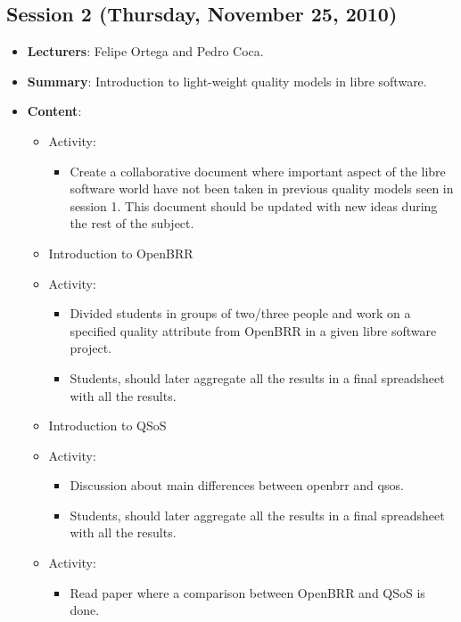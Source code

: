 \documentclass[a4paper]{article}
\begin{document}
\subsection{Session 2 (Thursday, November 25, 2010)}

\begin{itemize}
 \item \textbf{Lecturers}: Felipe Ortega and Pedro Coca.
 \item \textbf{Summary}: Introduction to light-weight quality models in libre software.
 \item \textbf{Content}:

 \begin{itemize}
      \item Activity:
        \begin{itemize}
          \item Create a collaborative document where important aspect of the libre software world
          have not been taken in previous quality models seen in session 1. This document should 
          be updated with new ideas during the rest of the subject.
        \end{itemize}
      \item Introduction to OpenBRR
      \item Activity: 
        \begin{itemize}
          \item Divided students in groups of two/three people and work on a specified quality attribute from OpenBRR
          in a given libre software project.
          \item Students, should later aggregate all the results in a final spreadsheet with all the results.
        \end{itemize}
       \item Introduction to QSoS
       \item Activity:
         \begin{itemize}
           \item Discussion about main differences between openbrr and qsos.
           \item Students, should later aggregate all the results in a final spreadsheet with all the results.
         \end{itemize}
       \item Activity:
         \begin{itemize}
          \item Read paper where a comparison between OpenBRR and QSoS is done.
        \end{itemize}

 \end{itemize}    

\end{itemize}
\end{document}

